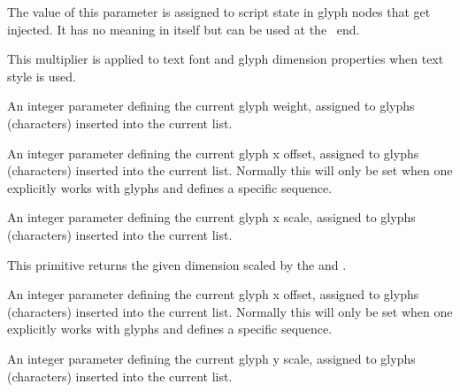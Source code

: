 \startnewprimitive[title={\prm {glyphstatefield}}]

The value of this parameter is assigned to script state in glyph nodes that get
injected. It has no meaning in itself but can be used at the \LUA\ end.

\stopnewprimitive

\startnewprimitive[title={\prm {glyphtextscale}}]

This multiplier is applied to text font and glyph dimension properties when text
style is used.

\stopnewprimitive

\startnewprimitive[title={\prm {glyphweight}}]

An integer parameter defining the current glyph weight, assigned to glyphs
(characters) inserted into the current list.

\stopnewprimitive

\startnewprimitive[title={\prm {glyphxoffset}}]

An integer parameter defining the current glyph x offset, assigned to glyphs
(characters) inserted into the current list. Normally this will only be set when
one explicitly works with glyphs and defines a specific sequence.

\stopnewprimitive

\startnewprimitive[title={\prm {glyphxscale}}]

An integer parameter defining the current glyph x scale, assigned to glyphs
(characters) inserted into the current list.

\stopnewprimitive

\startnewprimitive[title={\prm {glyphxscaled}}]

This primitive returns the given dimension scaled by the  and
.

\stopnewprimitive

\startnewprimitive[title={\prm {glyphyoffset}}]

An integer parameter defining the current glyph x offset, assigned to glyphs
(characters) inserted into the current list. Normally this will only be set when
one explicitly works with glyphs and defines a specific sequence.

\stopnewprimitive

\startnewprimitive[title={\prm {glyphyscale}}]

An integer parameter defining the current glyph y scale, assigned to glyphs
(characters) inserted into the current list.

